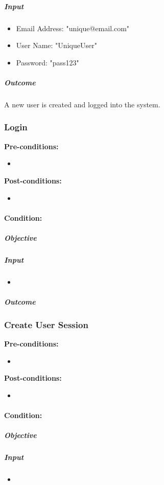 \documentclass{article}
\begin{document}
			\subparagraph{Input}
			\begin{itemize}
				\item Email Address: "unique@email.com"
				\item User Name: "UniqueUser"
				\item Password: "pass123"
			\end{itemize}
			
			\subparagraph{Outcome}
				A new user is created and logged into the system.
		
		\subsubsection{Login}
		\textbf{Pre-conditions:}
		\begin{itemize}
			\item 
		\end{itemize}
		\textbf{Post-conditions:}
		\begin{itemize}
			\item 
		\end{itemize}
		
		\paragraph{Condition: }
		\subparagraph{Objective}
		
		\subparagraph{Input}
		\begin{itemize}
			\item 
		\end{itemize}
		
		\subparagraph{Outcome}
		
		\subsubsection{Create User Session}
		\textbf{Pre-conditions:}
		\begin{itemize}
			\item 
		\end{itemize}
		\textbf{Post-conditions:}
		\begin{itemize}
			\item 
		\end{itemize}
		
		\paragraph{Condition: }
		\subparagraph{Objective}
		
		\subparagraph{Input}
		\begin{itemize}
			\item 
		\end{itemize}
		
\end{document}
